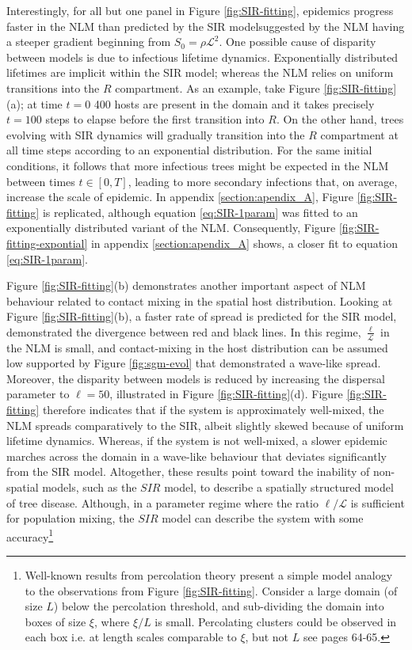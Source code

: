 Interestingly, for all but one panel in Figure \ref{fig:SIR-fitting}, epidemics progress faster in the NLM than predicted by the SIR model\textemdash suggested by the NLM having a steeper gradient beginning from $S_0=\rho\mathcal{L}^2$. 
One possible cause of disparity between models is due to infectious lifetime dynamics. 
Exponentially distributed lifetimes are implicit within the SIR model;
whereas the NLM relies on uniform transitions into the $R$ compartment. 
As an example, take Figure \ref{fig:SIR-fitting}(a); at time $t=0$ 400 hosts are present in the domain and it takes precisely $t=100$ steps to elapse before the first transition into $R$.
On the other hand, trees evolving with SIR dynamics will gradually transition into the $R$ compartment at all time steps according to an exponential distribution. 
For the same initial conditions, it follows that more infectious trees might be expected in the NLM between times $t\in [0, T]$, leading to more secondary infections that, on average, increase the scale of epidemic.
In appendix \ref{section:apendix_A}, Figure \ref{fig:SIR-fitting} is replicated, although equation \ref{eq:SIR-1param} was fitted to an exponentially distributed variant of the NLM.
Consequently, Figure \ref{fig:SIR-fitting-expontial} in appendix \ref{section:apendix_A} shows, a closer fit to equation \ref{eq:SIR-1param}.
 
Figure \ref{fig:SIR-fitting}(b) demonstrates another important aspect of NLM behaviour related to contact mixing in the spatial host distribution.
Looking at Figure \ref{fig:SIR-fitting}(b), a faster rate of spread is predicted for the SIR model,
demonstrated the divergence between red and black lines.
In this regime, $\frac{\ell}{\mathcal{L}}$ in the NLM is small, and contact-mixing in the host distribution can be assumed low \textemdash supported by Figure \ref{fig:sgm-evol} that demonstrated a wave-like spread. 
Moreover, the disparity between models is reduced by increasing the dispersal parameter to $\ell=50$, illustrated in Figure \ref{fig:SIR-fitting}(d).
Figure \ref{fig:SIR-fitting} therefore indicates that if the system is approximately well-mixed, the NLM spreads comparatively to the SIR, albeit slightly skewed because of uniform lifetime dynamics.
Whereas, if the system is not well-mixed, a slower epidemic marches across the domain in a wave-like behaviour that deviates significantly from the SIR model.
Altogether, these results point toward the inability of non-spatial models, such as the $SIR$ model, to describe a spatially structured model of tree disease. Although, in a parameter regime where the ratio $\ell / \mathcal{L}$ is sufficient for population mixing, the $SIR$ model can describe the system with some accuracy\footnote{
Well-known results from percolation theory present a simple model analogy to the observations from Figure \ref{fig:SIR-fitting}.
Consider a large domain (of size $L$) below the percolation threshold, and sub-dividing the domain into boxes of size $\xi$, where $\xi / L$ is small.
Percolating clusters could be observed in each box i.e. at length scales comparable to $\xi$, but not $L$ see \cite{stauffer2018introduction} pages 64-65.} 



